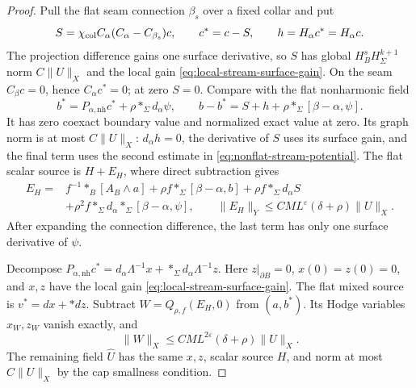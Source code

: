 \documentclass[11pt]{amsart}
\theoremstyle{definition}
\theoremstyle{remark}
\theoremstyle{plain}
\begin{document}
\begin{proof}
Pull the flat seam connection $\beta_s$ over a fixed collar
and put
\begin{equation}\label{eq:coexact-stream-correction}
 S=\chi_{\rm col}C_\alpha(C_\alpha-C_{\beta_s})c,\qquad
 c^*=c-S,\qquad h=H_\alpha c^*=H_\alpha c.
\end{equation}
The projection difference gains one surface derivative, so
$S$ has global $H_B^sH_\Sigma^{k+1}$ norm $C\|U\|_X$
and the local gain \eqref{eq:local-stream-surface-gain}.
On the seam $C_\beta c=0$, hence $C_\alpha c^*=0$;
at zero $S=0$. Compare with the flat nonharmonic field
\[
 b^*=P_{\alpha,\mathrm{nh}}c^*+\rho *_\Sigma d_\alpha\psi,
 \qquad
 b-b^*=S+h+\rho *_\Sigma[\beta-\alpha,\psi].
\]
It has zero coexact boundary value and normalized exact value
at zero. Its graph norm is at most $C\|U\|_X$:
$d_\alpha h=0$, the derivative of $S$ uses its surface
gain, and the final term uses the second estimate in
\eqref{eq:nonflat-stream-potential}.
The flat scalar source is $H+E_H$, where direct subtraction gives
\begin{equation}\label{eq:nonflat-stream-scalar-error}
\begin{aligned}
 E_H={}&f^{-1}*_B[A_B\wedge a]
       +\rho f *_\Sigma[\beta-\alpha,b]
       +\rho f *_\Sigma d_\alpha S\\
      &+\rho^2f *_\Sigma d_\alpha *_\Sigma[\beta-\alpha,\psi],
 \qquad
 \|E_H\|_Y\leq CML^\varepsilon(\delta+\rho)\|U\|_X .
\end{aligned}
\end{equation}
After expanding the connection difference, the last term has
only one surface derivative of $\psi$.

Decompose
$P_{\alpha,\mathrm{nh}}c^*
=d_\alpha\Lambda^{-1}x+*_\Sigma d_\alpha\Lambda^{-1}z$.
Here $z|_{\partial B}=0$, $x(0)=z(0)=0$, and $x,z$ have
the local gain \eqref{eq:local-stream-surface-gain}.
The flat mixed source is $v^*=dx+*dz$.
Subtract $W=Q_{\rho,f}(E_H,0)$ from $(a,b^*)$.
Its Hodge variables $x_W,z_W$ vanish exactly, and
\begin{equation}\label{eq:nonflat-stream-particular-error}
 \|W\|_X\leq CML^{2\varepsilon}(\delta+\rho)\|U\|_X.
\end{equation}
The remaining field $\widehat U$ has the same $x,z$, scalar
source $H$, and norm at most $C\|U\|_X$ by the cap smallness
condition.


\end{proof}
\end{document}
